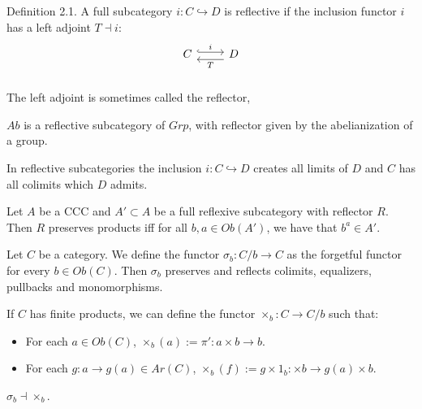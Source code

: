\begin{definition}
  Definition 2.1. A full subcategory $i:C\hookrightarrow D$ is reflective if the inclusion functor $i$ has a left adjoint $T\dashv i$:
  \[
    \begin{tikzcd}
      C\arrow[hookrightarrow, shift left=.5ex, "i"{name=T}]{r}{} &
      D\arrow[ shift left=1ex, "T"{name=i}]{l}{} \\
    \end{tikzcd}
  \]
  The left adjoint is sometimes called the reflector,
\end{definition}

\begin{example}
  $Ab$ is a reflective subcategory of $Grp$, with reflector given by the abelianization of a group.
\end{example}


\begin{proposition}
  In reflective subcategories the inclusion $i:C\hookrightarrow D$ creates all limits of $D$ and $C$ has all colimits which $D$ admits.
\end{proposition}


\begin{theorem}
  Let $A$ be a CCC and $A'\subset A$ be a full reflexive subcategory with reflector  $R$. Then $R$ preserves products iff for all $b,a\in Ob(A')$, we have that $b^a\in A'$.
\end{theorem}
\begin{corollary}
  Let $C$ be a category. We define the functor $\sigma_b : C/b \to C$ as the forgetful functor for every $b\in Ob(C)$. Then $\sigma_b$ preserves and reflects colimits, equalizers, pullbacks and monomorphisms.
\end{corollary}

If $C$ has finite products, we can define the functor $\times_b: C \to C/b$ such that:
\begin{itemize}
\item For each $a\in Ob(C)$, $\times_b(a) := \pi':a\times b \to b$.
\item For each $g:a\to g(a)\in Ar(C)$, $\times_b(f) := g\times 1_{b}: \times b \to g(a)\times b$.
\end{itemize}

\begin{proposition}
  $\sigma_b \dashv \times_b$.\\
\end{proposition}

